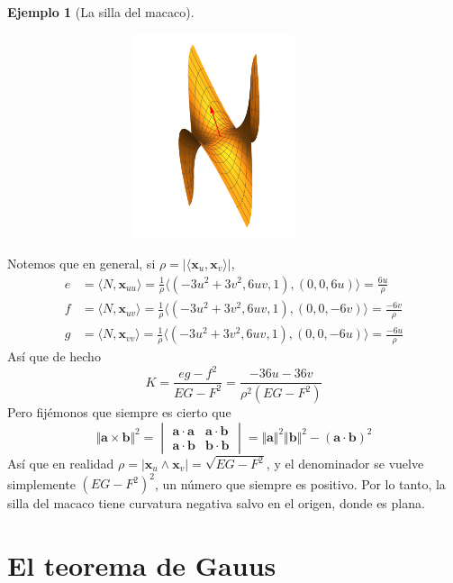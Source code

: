 \documentclass[spanish]{book}
\theoremstyle{definition}
\newtheorem*{ejem}{Ejemplo}
\begin{document}
\begin{ejem}[La silla del macaco]
\begin{figure}[H]
		\centering
		\includegraphics[width=10cm,height=6cm]{gauss3}
	\end{figure}
	\vspace{-0.5cm}
	Notemos que en general, si $\rho=|\langle\mathbf x_u,\mathbf x_v\rangle|$,
	\begin{align*}
		e&=\langle N,\mathbf x_{uu}\rangle=\frac{1}{\rho}\langle(-3u^2+3v^2,6uv,1),(0,0,6u)\rangle=\frac{6u}{\rho}\\
		f&=\langle N,\mathbf x_{uv}\rangle=\frac{1}{\rho}\langle(-3u^2+3v^2,6uv,1),(0,0,-6v)\rangle=\frac{-6v}{\rho}\\
		g&=\langle N,\mathbf x_{vv}\rangle=\frac{1}{\rho}\langle(-3u^2+3v^2,6uv,1),(0,0,-6u)\rangle=\frac{-6u}{\rho}
	\end{align*}
	Así que de hecho
	\[K=\frac{eg-f^2}{EG-F^2}=\frac{-36u-36v}{\rho^2(EG-F^2)}\]
	Pero fijémonos que siempre es cierto que
	\[\Vert\mathbf{a}\times\mathbf{b}\Vert^2=\begin{vmatrix}
		\mathbf{a}\cdot\mathbf{a}&\mathbf{a}\cdot\mathbf{b}\\
		\mathbf{a}\cdot\mathbf{b}&\mathbf{b}\cdot\mathbf{b}\end{vmatrix}=\Vert\mathbf{a}\Vert^2\Vert\mathbf{b}\Vert^2-(\mathbf{a}\cdot\mathbf{b})^2\]
	Así que en realidad $\rho=|\mathbf x_u\wedge \mathbf x_v|=\sqrt{EG-F^2}$, y el denominador se vuelve simplemente $(EG-F^2)^2$, un número que siempre es positivo. Por lo tanto, la silla del macaco tiene curvatura negativa salvo en el origen, donde es plana.
\end{ejem}

\section{El teorema de Gauus}
\end{document}
